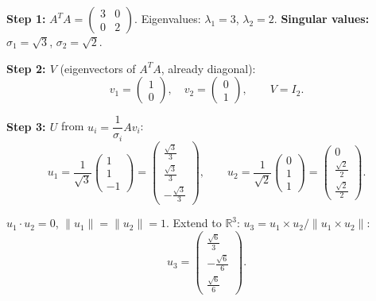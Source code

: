 \documentclass[12pt,a3paper]{article}
\begin{document}
\begin{tcolorbox}[enhanced,breakable,
  colback=cD!4,colframe=cD,boxrule=0.8pt,arc=5pt,
  title={\textbf{Answer --- SVD of $A=\begin{pmatrix}1&0\\1&1\\-1&1\end{pmatrix}$}},
  fonttitle=\bfseries\color{white},colbacktitle=cD]

\textbf{Step 1:}
$A^TA=\begin{pmatrix}3&0\\0&2\end{pmatrix}$. Eigenvalues: $\lambda_1=3$, $\lambda_2=2$.
\textbf{Singular values:} $\sigma_1=\sqrt{3}$, $\sigma_2=\sqrt{2}$.

\textbf{Step 2: $V$} (eigenvectors of $A^TA$, already diagonal):
\[
v_1=\begin{pmatrix}1\\0\end{pmatrix},\quad v_2=\begin{pmatrix}0\\1\end{pmatrix},\qquad
V=I_2.
\]

\textbf{Step 3: $U$} from $u_i=\dfrac{1}{\sigma_i}Av_i$:
\[
u_1=\frac{1}{\sqrt{3}}\begin{pmatrix}1\\1\\-1\end{pmatrix}
=\begin{pmatrix}\frac{\sqrt{3}}{3}\\\frac{\sqrt{3}}{3}\\-\frac{\sqrt{3}}{3}\end{pmatrix},\qquad
u_2=\frac{1}{\sqrt{2}}\begin{pmatrix}0\\1\\1\end{pmatrix}
=\begin{pmatrix}0\\\frac{\sqrt{2}}{2}\\\frac{\sqrt{2}}{2}\end{pmatrix}.
\]

$u_1\cdot u_2=0$, $\|u_1\|=\|u_2\|=1$. Extend to $\mathbb{R}^3$: $u_3=u_1\times u_2/\|u_1\times u_2\|$:
\[
u_3=\begin{pmatrix}\frac{\sqrt{6}}{3}\\-\frac{\sqrt{6}}{6}\\\frac{\sqrt{6}}{6}\end{pmatrix}.
\]


\end{tcolorbox}
\end{document}

